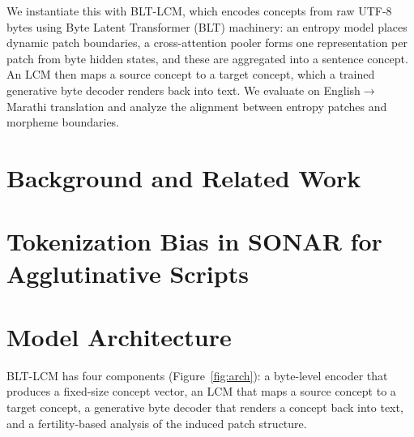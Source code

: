 \documentclass{article}
\begin{document}
We instantiate this with BLT-LCM, which encodes concepts from raw UTF-8 bytes using Byte Latent Transformer (BLT) machinery: an entropy model places dynamic patch boundaries, a cross-attention pooler forms one representation per patch from byte hidden states, and these are aggregated into a sentence concept. An LCM then maps a source concept to a target concept, which a trained generative byte decoder renders back into text. We evaluate on English$\rightarrow$Marathi translation and analyze the alignment between entropy patches and morpheme boundaries.

\section{Background and Related Work}

\section{Tokenization Bias in SONAR for Agglutinative Scripts}

\section{Model Architecture}

BLT-LCM has four components (Figure~\ref{fig:arch}): a byte-level encoder that produces a fixed-size concept vector, an LCM that maps a source concept to a target concept, a generative byte decoder that renders a concept back into text, and a fertility-based analysis of the induced patch structure.
\end{document}
